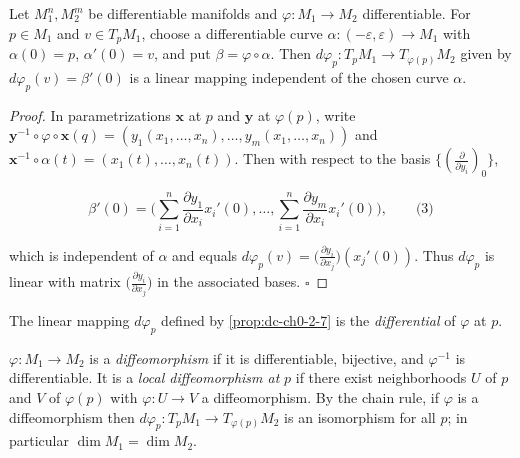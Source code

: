 \begin{proposition}
  \label{prop:dc-ch0-2-7}
  \leanok
  Let $M_1^n,M_2^m$ be differentiable manifolds and $\varphi:M_1\to M_2$
  differentiable. For $p\in M_1$ and $v\in T_pM_1$, choose a differentiable curve
  $\alpha:(-\varepsilon,\varepsilon)\to M_1$ with $\alpha(0)=p$, $\alpha'(0)=v$, and
  put $\beta=\varphi\circ\alpha$. Then
  $d\varphi_p:T_pM_1\to T_{\varphi(p)}M_2$ given by $d\varphi_p(v)=\beta'(0)$ is a
  linear mapping independent of the chosen curve $\alpha$.
\end{proposition}
\begin{proof}
  \sketch
  \leanok
  In parametrizations $\mathbf{x}$ at $p$ and $\mathbf{y}$ at $\varphi(p)$,
  write $\mathbf{y}^{-1}\circ\varphi\circ\mathbf{x}(q)=(y_1(x_1,\dots,x_n),\dots,y_m(x_1,\dots,x_n))$
  and $\mathbf{x}^{-1}\circ\alpha(t)=(x_1(t),\dots,x_n(t))$. Then with respect to
  the basis $\{(\frac{\partial}{\partial y_i})_0\}$,
  
  $$
  \beta'(0)=\Big(\sum_{i=1}^n\frac{\partial y_1}{\partial x_i}x_i'(0),\dots,\sum_{i=1}^n\frac{\partial y_m}{\partial x_i}x_i'(0)\Big),\qquad\text{(3)}
  $$
  
  which is independent of $\alpha$ and equals
  $d\varphi_p(v)=\big(\frac{\partial y_i}{\partial x_j}\big)(x_j'(0))$. Thus
  $d\varphi_p$ is linear with matrix $\big(\frac{\partial y_i}{\partial x_j}\big)$
  in the associated bases. $\square$
\end{proof}

\begin{definition}[differential]
  \label{def:dc-ch0-2-8}
  \leanok
  The linear mapping $d\varphi_p$ defined by \cref{prop:dc-ch0-2-7} is the \emph{differential}
  of $\varphi$ at $p$.
\end{definition}

\begin{definition}
  \label{def:dc-ch0-2-9}
  \leanok
  $\varphi:M_1\to M_2$ is a \emph{diffeomorphism} if it is differentiable, bijective, and
  $\varphi^{-1}$ is differentiable. It is a \emph{local diffeomorphism at} $p$ if there
  exist neighborhoods $U$ of $p$ and $V$ of $\varphi(p)$ with $\varphi:U\to V$ a
  diffeomorphism. By the chain rule, if $\varphi$ is a diffeomorphism then
  $d\varphi_p:T_pM_1\to T_{\varphi(p)}M_2$ is an isomorphism for all $p$; in
  particular $\dim M_1=\dim M_2$.
\end{definition}


